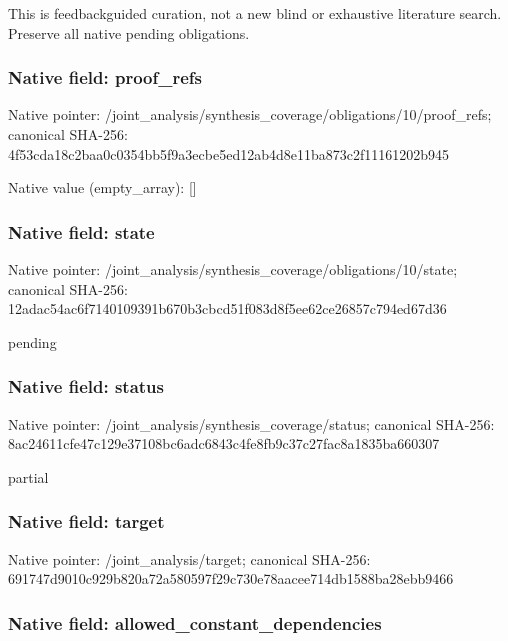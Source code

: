 \documentclass[10pt,a4paper]{article}
\begin{document}
This is feedbackguided curation, not a new blind or exhaustive literature search. Preserve all native pending obligations.


\subsubsection{Native field: proof\_refs}


Native pointer: /joint\_analysis/synthesi\allowbreak{}s\_coverage/obligations/1\allowbreak{}0/proof\_refs; canonical SHA-256: 4f53cda18c2baa0c0354bb5f\allowbreak{}9a3ecbe5ed12ab4d8e11ba87\allowbreak{}3c2f11161202b945



Native value (empty\_array): []



\subsubsection{Native field: state}


Native pointer: /joint\_analysis/synthesi\allowbreak{}s\_coverage/obligations/1\allowbreak{}0/state; canonical SHA-256: 12adac54ac6f7140109391b6\allowbreak{}70b3cbcd51f083d8f5ee62ce\allowbreak{}26857c794ed67d36


pending


\subsubsection{Native field: status}


Native pointer: /joint\_analysis/synthesi\allowbreak{}s\_coverage/status; canonical SHA-256: 8ac24611cfe47c129e37108b\allowbreak{}c6adc6843c4fe8fb9c37c27f\allowbreak{}ac8a1835ba660307


partial


\subsubsection{Native field: target}


Native pointer: /joint\_analysis/target; canonical SHA-256: 691747d9010c929b820a72a5\allowbreak{}80597f29c730e78aacee714d\allowbreak{}b1588ba28ebb9466



\subsubsection{Native field: allowed\_constant\_dependencies}
\end{document}
